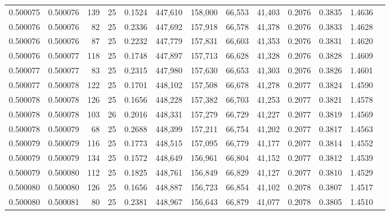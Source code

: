 \begin{tabular}{rrrrrrrrrrrrr}
0.500075 & 0.500076 & 139 &  25 &                                     0.1524 & 447,610 & 158,000 &  66,553 &  41,403 & 0.2076 & 0.3835 & 1.4636 \\
0.500076 & 0.500076 &  82 &  25 &                                     0.2336 & 447,692 & 157,918 &  66,578 &  41,378 & 0.2076 & 0.3833 & 1.4628 \\
0.500076 & 0.500076 &  87 &  25 &                                     0.2232 & 447,779 & 157,831 &  66,603 &  41,353 & 0.2076 & 0.3831 & 1.4620 \\
0.500076 & 0.500077 & 118 &  25 &                                     0.1748 & 447,897 & 157,713 &  66,628 &  41,328 & 0.2076 & 0.3828 & 1.4609 \\
0.500077 & 0.500077 &  83 &  25 &                                     0.2315 & 447,980 & 157,630 &  66,653 &  41,303 & 0.2076 & 0.3826 & 1.4601 \\
0.500077 & 0.500078 & 122 &  25 &                                     0.1701 & 448,102 & 157,508 &  66,678 &  41,278 & 0.2077 & 0.3824 & 1.4590 \\
0.500078 & 0.500078 & 126 &  25 &                                     0.1656 & 448,228 & 157,382 &  66,703 &  41,253 & 0.2077 & 0.3821 & 1.4578 \\
0.500078 & 0.500078 & 103 &  26 &                                     0.2016 & 448,331 & 157,279 &  66,729 &  41,227 & 0.2077 & 0.3819 & 1.4569 \\
0.500078 & 0.500079 &  68 &  25 &                                     0.2688 & 448,399 & 157,211 &  66,754 &  41,202 & 0.2077 & 0.3817 & 1.4563 \\
0.500079 & 0.500079 & 116 &  25 &                                     0.1773 & 448,515 & 157,095 &  66,779 &  41,177 & 0.2077 & 0.3814 & 1.4552 \\
0.500079 & 0.500079 & 134 &  25 &                                     0.1572 & 448,649 & 156,961 &  66,804 &  41,152 & 0.2077 & 0.3812 & 1.4539 \\
0.500079 & 0.500080 & 112 &  25 &                                     0.1825 & 448,761 & 156,849 &  66,829 &  41,127 & 0.2077 & 0.3810 & 1.4529 \\
0.500080 & 0.500080 & 126 &  25 &                                     0.1656 & 448,887 & 156,723 &  66,854 &  41,102 & 0.2078 & 0.3807 & 1.4517 \\
0.500080 & 0.500081 &  80 &  25 &                                     0.2381 & 448,967 & 156,643 &  66,879 &  41,077 & 0.2078 & 0.3805 & 1.4510 \\

\end{tabular}
